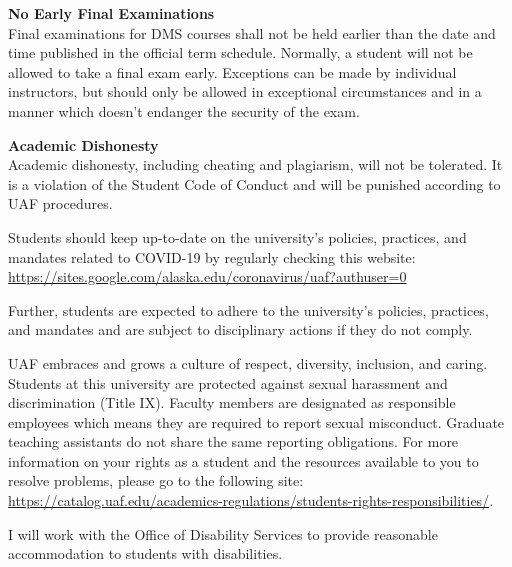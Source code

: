 \documentclass[12pt]{article}
\renewcommand{\emph}[1]{\textsf{\textbf{#1}}}
\newcommand{\localhead}[1]{\par\smallskip\textbf{#1}\nobreak\\}%
\def\subheading#1{\localhead{\emph{#1}}}
\begin{document}
\subheading{No Early Final Examinations}
Final examinations for DMS
  courses shall not be held earlier than the date and time published
  in the official term schedule. Normally, a student will not be
  allowed to take a final exam early. Exceptions can be made by
  individual instructors, but should only be allowed in exceptional
  circumstances and in a manner which doesn't endanger the security of
  the exam.

\subheading{Academic Dishonesty}
Academic dishonesty, including cheating and plagiarism, will not
be tolerated.  It is a violation of the Student Code of Conduct
and will be punished according to UAF procedures.

 
  Students should keep up-to-date on the university's policies, practices, and mandates related to COVID-19 by regularly checking this website: \url{https://sites.google.com/alaska.edu/coronavirus/uaf?authuser=0}

Further, students are expected to adhere to the university's policies, practices, and mandates and are subject to disciplinary actions if they do not comply.

 UAF embraces and grows a culture of respect, diversity, inclusion, and caring. Students at this university are protected against sexual harassment and discrimination (Title IX). Faculty members are designated as responsible employees which means they are required to report sexual misconduct. Graduate teaching assistants do not share the same reporting obligations. For more information on your rights as a student and the resources available to you to resolve problems, please go to the following site: \url{https://catalog.uaf.edu/academics-regulations/students-rights-responsibilities/}.

 I will work with the Office of Disability Services to provide reasonable accommodation to students with disabilities.
\end{document}
